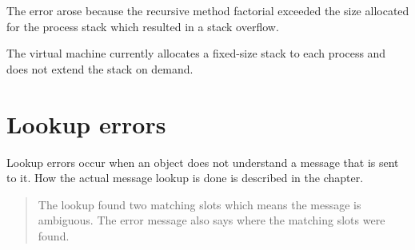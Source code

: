\documentclass[letterpaper,10pt,english]{sphinxmanual}
\begin{document}
The error arose because the recursive method factorial exceeded the size allocated for the process
stack which resulted in a stack overflow.

The virtual machine currently allocates a fixed-size stack to each process and does not extend the stack on demand.


\section{Lookup errors}
\label{\detokenize{vmref:lookup-errors}}
Lookup errors occur when an object does not understand a message that is sent to it. How the actual
message lookup is done is described in the {\hyperref[\detokenize{langref::doc}]{}} chapter.
\begin{description}
\item[{}] \leavevmode
{}

\item[{}] \leavevmode
{}

\end{description}

\begin{DUlineblock}{0em}
\item[] 
\item[] 
\end{DUlineblock}
\begin{quote}

\begin{DUlineblock}{0em}
\item[] The lookup found two matching  slots which means the message is ambiguous. The error message also says where the matching slots were found.
\end{DUlineblock}
\end{quote}
\end{document}
